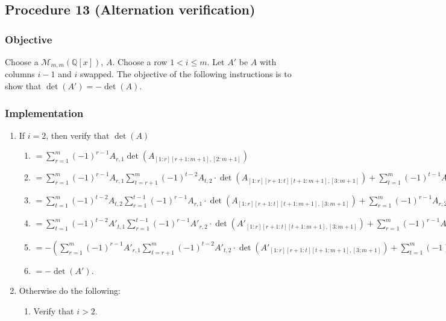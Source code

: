 \documentclass[twocolumn]{article}
\begin{document}
		\subsection{Procedure 13 (Alternation verification)}\label{sec:procedure 13}
			\subsubsection{Objective}
				Choose a $\mathcal{M}_{m,m}(\mathbb{Q}[x])$, $A$. Choose a row $1<i\le m$. Let $A'$ be $A$ with columns $i-1$ and $i$ swapped. The objective of the following instructions is to show that $\det(A')=-\det(A)$.
			\subsubsection{Implementation}
				\begin{enumerate}
					\item If $i=2$, then verify that $\det(A)$
					\begin{enumerate}
						\item $=\sum_{r=1}^m (-1)^{r-1}A_{r,1}\det(A_{[1:r][r+1:m+1],[2:m+1]})$
						\item $=\sum_{r=1}^m (-1)^{r-1}A_{r,1}\sum_{t=r+1}^m (-1)^{t-2}A_{t,2}\cdot\det(A_{[1:r][r+1:t][t+1:m+1],[3:m+1]})+\sum_{t=1}^m (-1)^{t-1}A_{t,1}\sum_{r=1}^{t-1} (-1)^{r-1}A_{r,2}\cdot\det(A_{[1:r][r+1:t][t+1:m+1],[3:m+1]})$
						\item $=\sum_{t=1}^m (-1)^{t-2}A_{t,2}\sum_{r=1}^{t-1} (-1)^{r-1}A_{r,1}\cdot\det(A_{[1:r][r+1:t][t+1:m+1],[3:m+1]})+\sum_{r=1}^m (-1)^{r-1}A_{r,2}\sum_{t=r+1}^m (-1)^{t-1}A_{t,1}\cdot\det(A_{[1:r][r+1:t][t+1:m+1],[3:m+1]})$
						\item $=\sum_{t=1}^m (-1)^{t-2}A'_{t,1}\sum_{r=1}^{t-1} (-1)^{r-1}A'_{r,2}\cdot\det(A'_{[1:r][r+1:t][t+1:m+1],[3:m+1]})+\sum_{r=1}^m (-1)^{r-1}A'_{r,1}\sum_{t=r+1}^m (-1)^{t-1}A'_{t,2}\cdot\det(A'_{[1:r][r+1:t][t+1:m+1],[3:m+1]})$
						\item $=-(\sum_{r=1}^m (-1)^{r-1}A'_{r,1}\sum_{t=r+1}^m (-1)^{t-2}A'_{t,2}\cdot\det(A'_{[1:r][r+1:t][t+1:m+1],[3:m+1]})+\sum_{t=1}^m (-1)^{t-1}A'_{t,1}\sum_{r=1}^{t-1} (-1)^{r-1}A'_{r,2}\cdot\det(A'_{[1:r][r+1:t][t+1:m+1],[3:m+1]}))$
						\item $=-\det(A')$.
					\end{enumerate}
					\item Otherwise do the following:
					\begin{enumerate}
						\item Verify that $i>2$.

\end{enumerate}
\end{enumerate}
\end{document}
